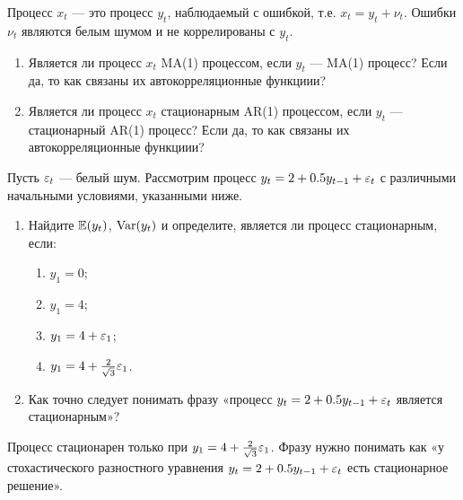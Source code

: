 \begin{problem}
Процесс $x_t$ — это процесс $y_t$, наблюдаемый с ошибкой, т.е. $x_t=y_t+\nu_t$. Ошибки $\nu_t$ являются белым шумом и не коррелированы с $y_t$.
\begin{enumerate}
\item Является ли процесс $x_t$ MA(1) процессом, если $y_t$ —  MA(1) процесс? Если да, то как связаны их автокорреляционные функциии?
\item Является ли процесс $x_t$ стационарным AR(1) процессом, если $y_t$ —  стационарный AR(1) процесс? Если да, то как связаны их автокорреляционные функциии?
\end{enumerate}


\begin{sol}

\end{sol}
\end{problem}


\begin{problem}
Пусть $\varepsilon_t$ — белый шум. Рассмотрим процесс $y_t=2+0.5y_{t-1}+\varepsilon_t$ с различными начальными условиями, указанными ниже.

\begin{enumerate}
\item Найдите $\mathbb{E}(y_t)$, $\operatorname{Var}(y_t)$ и определите, является ли процесс  стационарным, если:
\begin{enumerate}
\item $y_1=0$;
\item $y_1=4$;
\item $y_1=4+\varepsilon_1$;
\item $y_1=4+\frac{2}{\sqrt{3}}\varepsilon_1$.
\end{enumerate}
\item Как точно следует понимать фразу «процесс $y_t=2+0.5y_{t-1}+\varepsilon_t$ является стационарным»?
\end{enumerate}




\begin{sol}
Процесс стационарен только при $y_1=4+\frac{2}{\sqrt{3}}\varepsilon_1$. Фразу нужно понимать как «у стохастического разностного уравнения $y_t=2+0.5y_{t-1}+\varepsilon_t$ есть стационарное решение».
\end{sol}
\end{problem}



